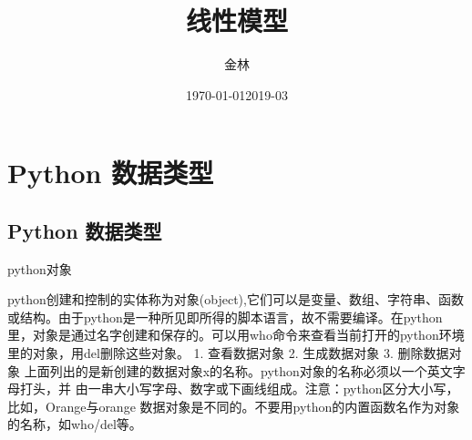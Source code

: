 \documentclass[ignorenonframetext,11pt,xcolor=dvipsnames,aspectratio=1610,hyperref={bookmarksdepth=4}]{beamer}
\author{金林}
\institute{中南财经政法大学统计系}
\date{\today}
\date{2019-03}
\title{线性模型}
\begin{document}
\frame{\titlepage}

\hypertarget{python-}{%
\section{Python 数据类型}\label{python-}}

\hypertarget{python--1}{%
\subsection{Python 数据类型}\label{python--1}}

\begin{frame}{python对象}
\protect\hypertarget{python}{}

python创建和控制的实体称为对象(object),它们可以是变量、数组、字符串、函数或结构。由于python是一种所见即所得的脚本语言，故不需要编译。在python里，对象是通过名字创建和保存的。可以用who命令来查看当前打开的python环境里的对象，用del删除这些对象。
1. 查看数据对象 2. 生成数据对象 3. 删除数据对象
上面列出的是新创建的数据对象x的名称。python对象的名称必须以一个英文字母打头，并
由一串大小写字母、数字或下画线组成。注意：python区分大小写，比如，Orange与orange
数据对象是不同的。不要用python的内置函数名作为对象的名称，如who/del等。

\end{frame}
\end{document}
